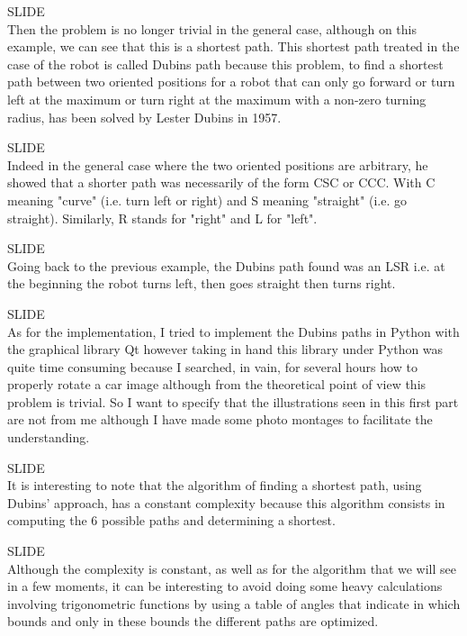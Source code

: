 \documentclass[12pt,a4paper]{article}
\newcommand{\slide}{\vspace{0.6cm}SLIDE\\}
\begin{document}
	\slide
	
	Then the problem is no longer trivial in the general case, although on this example, we can see that this is a shortest path. This shortest path treated in the case of the robot is called Dubins path because this problem, to find a shortest path between two oriented positions for a robot that can only go forward or turn left at the maximum or turn right at the maximum with a non-zero turning radius, has been solved by Lester Dubins in 1957.
	
	\slide
	
	Indeed in the general case where the two oriented positions are arbitrary, he showed that a shorter path was necessarily of the form CSC or CCC. With C meaning "curve" (i.e. turn left or right) and S meaning "straight" (i.e. go straight). Similarly, R stands for "right" and L for "left".
	
	\slide
	
	Going back to the previous example, the Dubins path found was an LSR i.e. at the beginning the robot turns left, then goes straight then turns right. %
	
	\slide
	
	As for the implementation, I tried to implement the Dubins paths in Python with the graphical library Qt however taking in hand this library under Python was quite time consuming because I searched, in vain, for several hours how to properly rotate a car image although from the theoretical point of view this problem is trivial. So I want to specify that the illustrations seen in this first part are not from me although I have made some photo montages to facilitate the understanding.%
	
	\slide
	
	It is interesting to note that the algorithm of finding a shortest path, using Dubins' approach, has a constant complexity because this algorithm consists in computing the 6 possible paths and determining a shortest.
	
	\slide
	
	Although the complexity is constant, as well as for the algorithm that we will see in a few moments, it can be interesting to avoid doing some heavy calculations involving trigonometric functions by using a table of angles that indicate in which bounds and only in these bounds the different paths are optimized.
	
\end{document}
